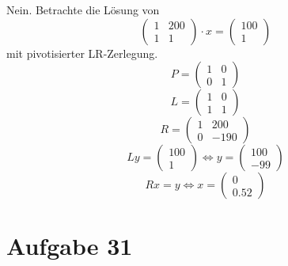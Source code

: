 \documentclass[10pt,a4paper]{article}
\begin{document}
Nein.
Betrachte die Lösung von
\begin{equation}
  \begin{pmatrix}
    1 & 200\\
    1 & 1
  \end{pmatrix}
  \cdot x = \begin{pmatrix}
    100\\1
  \end{pmatrix}
\end{equation}
mit pivotisierter LR-Zerlegung.
\begin{equation}
  P = \begin{pmatrix}
    1 & 0\\
    0 & 1
  \end{pmatrix}
\end{equation}
\begin{equation}
  L = \begin{pmatrix}
    1 & 0\\
    1 & 1
  \end{pmatrix}
\end{equation}
\begin{equation}
  R = \begin{pmatrix}
    1 & 200\\
    0 & -190
  \end{pmatrix}
\end{equation}
\begin{equation}
  Ly = \begin{pmatrix}
    100\\1
  \end{pmatrix}
  \Leftrightarrow
  y = \begin{pmatrix}
    100\\-99
  \end{pmatrix}
\end{equation}
\begin{equation}
  Rx = y
  \Leftrightarrow
  x = \begin{pmatrix}
    0\\0.52
  \end{pmatrix}
\end{equation}

\section{Aufgabe 31}
\end{document}
